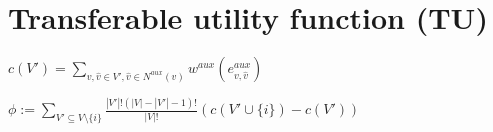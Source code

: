 \section{Transferable utility function (TU)}

$c(V') = \sum\limits_{v, \hat{v} \in V', \hat{v} \in N^{aux}(v)} w^{aux}(e^{aux}_{v, \hat{v}})
$

$\phi := \sum\limits_{V'\subseteq V\setminus \{i\}} \frac{|V'|! (|V|-|V'|-1)!}{|V|!} (c(V' \cup \{i\}) - c(V'))  $